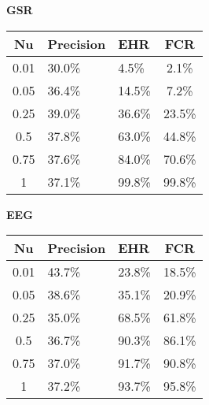 \begin{table}[h]
  \centering
  \textbf{GSR}\vspace{2pt}
  \begin{tabularx}{\columnwidth}{cXXc}
    \toprule
    \textbf{Nu} & \textbf{Precision} & \textbf{EHR} & \textbf{FCR} \\
    \midrule
    0.01        & 30.0\%             & 4.5\%        & 2.1\%        \\ \hline
    0.05        & 36.4\%             & 14.5\%       & 7.2\%        \\ \hline
    0.25        & 39.0\%             & 36.6\%       & 23.5\%       \\ \hline
    0.5         & 37.8\%             & 63.0\%       & 44.8\%       \\ \hline
    0.75        & 37.6\%             & 84.0\%       & 70.6\%       \\ \hline
    1           & 37.1\%             & 99.8\%       & 99.8\%       \\ \hline
    \bottomrule
  \end{tabularx}

  \vspace{4pt}

  \textbf{EEG}\vspace{2pt}
  \begin{tabularx}{\columnwidth}{cXXc}
    \toprule
    \textbf{Nu} & \textbf{Precision} & \textbf{EHR} & \textbf{FCR} \\
    \midrule
    0.01        & 43.7\%             & 23.8\%       & 18.5\%       \\ \hline
    0.05        & 38.6\%             & 35.1\%       & 20.9\%       \\ \hline
    0.25        & 35.0\%             & 68.5\%       & 61.8\%       \\ \hline
    0.5         & 36.7\%             & 90.3\%       & 86.1\%       \\ \hline
    0.75        & 37.0\%             & 91.7\%       & 90.8\%       \\ \hline
    1           & 37.2\%             & 93.7\%       & 95.8\%       \\ \hline
    \bottomrule
  \end{tabularx}

  \vspace{4pt}


\end{table}
